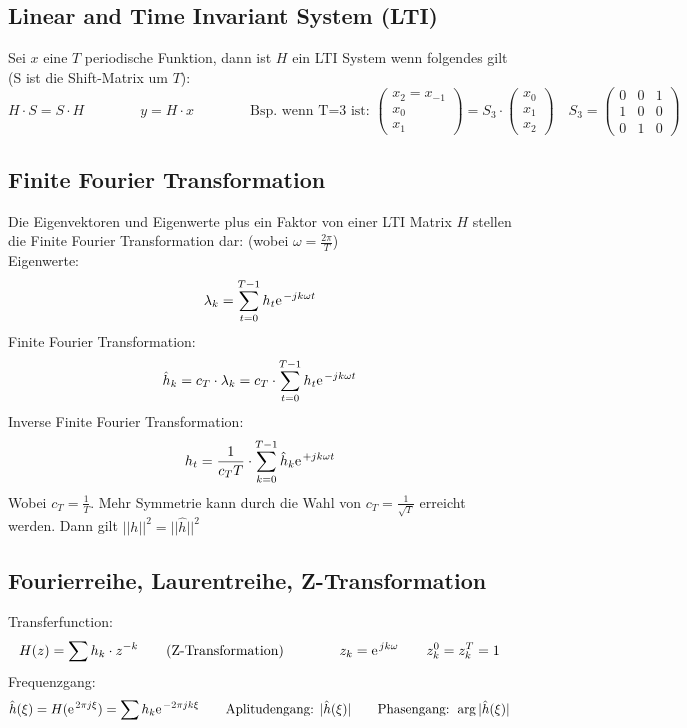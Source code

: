 \subsection{Linear and Time Invariant System (LTI)}
Sei $x$ eine $T$ periodische Funktion, dann ist $H$ ein LTI System wenn folgendes gilt (S ist die Shift-Matrix um $T$):
\[ 	H\cdot S = S\cdot H \qquad \qquad y=H\cdot x 
	\qquad \qquad 
	\text{Bsp. wenn T=3 ist: } \left( \begin{array}{ccc} x_2=x_{-1} \\ x_0 \\ x_1 \end{array} \right) = S_3 \cdot \left( \begin{array}{ccc} x_0 \\ x_1 \\ x_2 \end{array} \right) \quad
	S_3=
	\left( \begin{array}{ccc}
	0 & 0 & 1 \\
	1 & 0 & 0 \\
	0 & 1 & 0 
	\end{array} \right) 
\]


\subsection{Finite Fourier Transformation}
Die Eigenvektoren und Eigenwerte plus ein Faktor von einer LTI Matrix $H$ stellen die Finite Fourier Transformation dar: (wobei $\omega = \frac{2\pi}{T}$)\\

Eigenwerte: \[ \lambda_k = \sum_{t=0}^{T-1} h_t \e^{-jk\omega t} \]
Finite Fourier Transformation: \[ \hat{h}_k = c_T \cdot \lambda_k = c_T \cdot \sum_{t=0}^{T-1} h_t \e^{-jk\omega t} \]
Inverse Finite Fourier Transformation: \[ h_t = \frac{1}{c_T T} \cdot \sum_{k=0}^{T-1}\hat{h}_k \e^{+jk\omega t} \]
Wobei $c_T = \frac{1}{T}$. Mehr Symmetrie kann durch die Wahl von $c_T = \frac{1}{\sqrt{T}}$ erreicht werden. Dann gilt $||h||^2=||\hat{h}||^2$


\subsection{Fourierreihe, Laurentreihe, Z-Transformation}

Transferfunction: \[ H(z)=\sum h_k \cdot z^{-k} \qquad \text{(Z-Transformation)} \qquad \qquad z_k=\e^{jk\omega} \qquad z_k^0=z_k^T=1 \]
Frequenzgang: \[ \hat{h}(\xi) = H(\e^{2\pi j \xi})=\sum h_k \e^{-2\pi jk \xi} \qquad \text{Aplitudengang: } |\hat{h}(\xi)| \qquad \text{Phasengang: } \arg|\hat{h}(\xi)| \]

